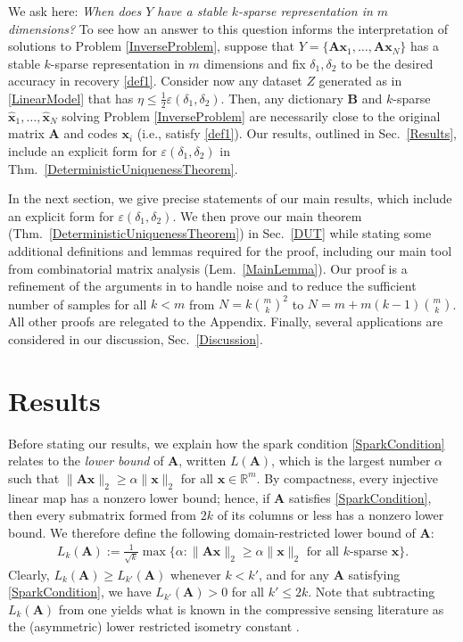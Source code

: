 \documentclass[9pt,twocolumn]{pnas-new}
\begin{document}
We ask here: \emph{When does $Y$ have a stable $k$-sparse representation in $m$ dimensions?} To see how an answer to this question informs the interpretation of solutions to Problem \ref{InverseProblem}, suppose that \mbox{$Y = \{\mathbf{A} \mathbf{x}_1, \ldots, \mathbf{A}\mathbf{x}_N\}$} has a stable $k$-sparse representation in $m$ dimensions and fix $\delta_1, \delta_2$ to be the desired accuracy in recovery \eqref{def1}. Consider now any dataset $Z$ generated as in \eqref{LinearModel} that has $\eta \leq \frac{1}{2} \varepsilon(\delta_1, \delta_2)$. Then, any dictionary $\mathbf{B}$ and $k$-sparse $\mathbf{\hat x}_1, \ldots, \mathbf{\hat x}_N$ solving Problem \ref{InverseProblem} are necessarily close to the original matrix $\mathbf{A}$ and codes $\mathbf{x}_i$ (i.e., satisfy \eqref{def1}). Our results, outlined in Sec.~\ref{Results}, include an explicit form for $\varepsilon(\delta_1, \delta_2)$ in Thm.~\ref{DeterministicUniquenessTheorem}. 

In the next section, we give precise statements of our main results, which include an explicit form for $\varepsilon(\delta_1, \delta_2)$. We then prove our main theorem (Thm.~\ref{DeterministicUniquenessTheorem}) in Sec.~\ref{DUT} while stating some additional definitions and lemmas required for the proof, including our main tool from combinatorial matrix analysis (Lem.~\ref{MainLemma}). Our proof is a refinement of the arguments in \cite{Hillar15} to handle noise and to reduce the sufficient number of samples for all $k < m$ from $N=k{m \choose k}^2$ to $N = m + m(k-1){m \choose k}$. All other proofs are relegated to the Appendix. Finally, several applications are considered in our discussion, Sec.~\ref{Discussion}.

\section{Results}

Before stating our results, we explain how the spark condition \eqref{SparkCondition} relates to the \emph{lower bound} \cite{Grcar10} of $\mathbf{A}$, written $L(\mathbf{A})$, which is the largest number $\alpha$ such that \mbox{$\|\mathbf{A}\mathbf{x}\|_2 \geq \alpha\|\mathbf{x}\|_2$} for all $\mathbf{x} \in \mathbb{R}^m$. By compactness, every injective linear map has a nonzero lower bound; hence, if $\mathbf{A}$ satisfies \eqref{SparkCondition}, then every submatrix formed from $2k$ of its columns or less has a nonzero lower bound. We therefore define the following domain-restricted lower bound of $\mathbf{A}$:
\begin{align*}
L_k(\mathbf{A}) := \frac{1}{\sqrt{k}}\max \{ \alpha : \|\mathbf{A}\mathbf{x}\|_2 \geq \alpha\|\mathbf{x}\|_2 \text{ for all $k$-sparse } \mathbf{x}\}.
\end{align*} 
Clearly, $L_k(\mathbf{A}) \geq L_{k'}(\mathbf{A})$ whenever $k < k'$, and for any $\mathbf{A}$ satisfying \eqref{SparkCondition}, we have $L_{k'}(\mathbf{A}) > 0$ for all $k' \leq 2k$. Note that subtracting $L_k(\mathbf{A})$ from one yields what is known in the compressive sensing literature as the (asymmetric) lower restricted isometry constant \cite{Blanchard2011, Foucart2009}. 
\end{document}
